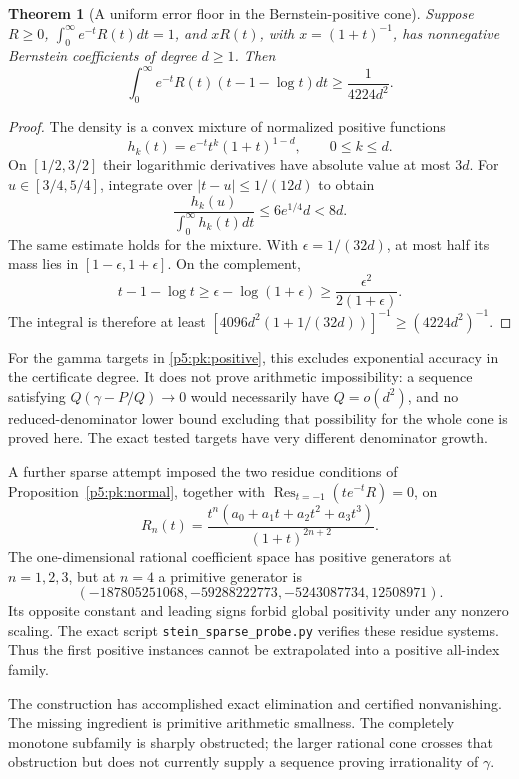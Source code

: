 \documentclass[11pt,a4paper]{article}
\newtheorem{theorem}{Theorem}[section]
\theoremstyle{definition}
\theoremstyle{remark}
\numberwithin{equation}{section}
\begin{document}
\begin{theorem}[A uniform error floor in the Bernstein-positive cone]
\label{p5:pk:bernstein-floor}
Suppose $R\ge0$, $\int_0^\infty e^{-t}R(t)dt=1$, and
$xR(t)$, with $x=(1+t)^{-1}$, has nonnegative Bernstein coefficients
of degree $d\ge1$. Then
\begin{equation}
 \int_0^\infty e^{-t}R(t)(t-1-\log t)dt
       \ge\frac1{4224d^2}.\label{p5:pk:floor}
\end{equation}
\end{theorem}
\begin{proof}
The density is a convex mixture of normalized positive functions
\[
 h_k(t)=e^{-t}t^k(1+t)^{1-d},\qquad 0\le k\le d.
\]
On $[1/2,3/2]$ their logarithmic derivatives have absolute value at
most $3d$. For $u\in[3/4,5/4]$, integrate over
$|t-u|\le1/(12d)$ to obtain
\[
 \frac{h_k(u)}{\int_0^\infty h_k(t)dt}
       \le6e^{1/4}d<8d.
\]
The same estimate holds for the mixture. With
$\epsilon=1/(32d)$, at most half its mass lies in
$[1-\epsilon,1+\epsilon]$. On the complement,
\[
 t-1-\log t\ge\epsilon-\log(1+\epsilon)
          \ge\frac{\epsilon^2}{2(1+\epsilon)}.
\]
The integral is therefore at least
$[4096d^2(1+1/(32d))]^{-1}\ge(4224d^2)^{-1}$.
\end{proof}
For the gamma targets in \eqref{p5:pk:positive}, this excludes exponential
accuracy in the certificate degree. It does not prove arithmetic
impossibility: a sequence satisfying $Q(\gamma-P/Q)\to0$ would necessarily
have $Q=o(d^2)$, and no reduced-denominator lower bound excluding that
possibility for the whole cone is proved here. The exact tested targets
have very different denominator growth.

A further sparse attempt imposed the two residue conditions of
Proposition~\ref{p5:pk:normal}, together with
$\operatorname{Res}_{t=-1}(te^{-t}R)=0$, on
\[
 R_n(t)=\frac{t^n(a_0+a_1t+a_2t^2+a_3t^3)}{(1+t)^{2n+2}}.
\]
The one-dimensional rational coefficient space has positive generators
at $n=1,2,3$, but at $n=4$ a primitive generator is
\[
 (-187805251068,-59288222773,-5243087734,12508971).
\]
Its opposite constant and leading signs forbid global positivity under
any nonzero scaling. The exact script
\texttt{stein\_sparse\_probe.py} verifies these residue systems.
Thus the first positive instances cannot be extrapolated into a positive
all-index family.

The construction has accomplished exact elimination and certified
nonvanishing. The missing ingredient is primitive arithmetic smallness.
The completely monotone subfamily is sharply obstructed; the larger
rational cone crosses that obstruction but does not currently supply a
sequence proving irrationality of $\gamma$.
\end{document}
